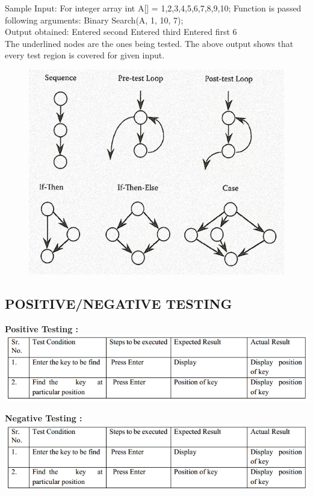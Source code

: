 \documentclass[a4paper,12pt]{article}
\begin{document}
Sample Input: For integer array int A[] = 1,2,3,4,5,6,7,8,9,10; Function 
is passed\\
following arguments: Binary Search(A, 1, 10, 7);\\
Output obtained: Entered second Entered third Entered first 6\\
The underlined nodes are the ones being tested. The above output shows
that every test region is covered for given input.\\

	\begin{figure}[h!]
		\centering
		\includegraphics[scale=0.30]{CFG.png}
	\end{figure}

\subsection{ POSITIVE/NEGATIVE TESTING }

\textbf{Positive Testing :}\\
\includegraphics[width=\textwidth]{binary_positive}
\vspace{30px}

\textbf{Negative Testing :}\\
\includegraphics[width=\textwidth]{binary_positive}
\end{document}
